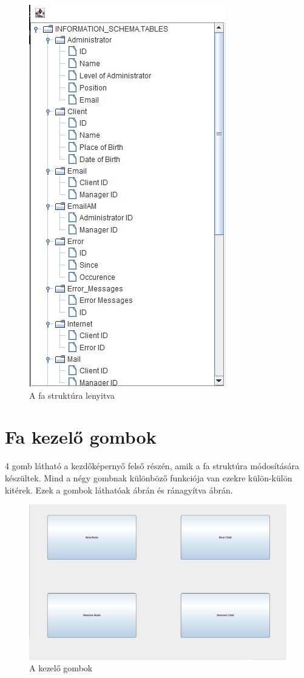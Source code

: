 \begin{figure} [H]
	\centering
	\includegraphics[height=.25\textheight]{images/tree_expanded.png}
	\caption{A fa struktúra lenyitva}
	\label{fig:treeexp}
\end{figure}

\section{Fa kezelő gombok} 4 gomb látható a kezdőképernyő felső részén, amik a fa struktúra módosítására készültek. Mind a négy gombnak különböző funkciója van ezekre külön-külön kitérek. Ezek a gombok láthatóak  ábrán és ránagyítva  ábrán.

\begin{figure} [H]
	\centering
	\includegraphics[height=.25\textheight]{images/node_buttons.png}
	\caption{A kezelő gombok}
	\label{fig:modify}
\end{figure}

